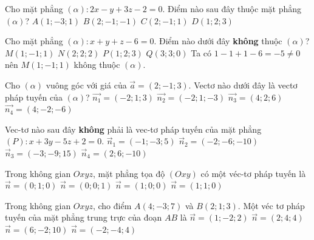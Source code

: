\begin{ex}
	Cho mặt phẳng $(\alpha) \colon 2x-y+3z-2=0$. Điểm nào sau đây thuộc mặt phẳng $(\alpha)$?
	\choice
	{$A(1;-3;1)$}
	{\True $B(2;-1;-1)$}
	{$C(2;-1;1)$}
	{$D(1;2;3)$}
\end{ex}
\begin{ex}%
	Cho mặt phẳng $(\alpha) \colon x+y+z-6=0$. Điểm nào dưới đây \textbf{không} thuộc $(\alpha)$?
	\choice
	{\True $M(1;-1;1)$}
	{$N(2;2;2)$}
	{$P(1;2;3)$}
	{$Q(3;3;0)$}
	\loigiai
	{
		Ta có $1-1+1-6=-5 \neq 0$ nên $M(1;-1;1)$ không thuộc $(\alpha)$.
	}
\end{ex}
\begin{ex}
	Cho $(\alpha)$ vuông góc với giá của $\vec{a}=(2;-1;3)$. Vectơ nào dưới đây là vectơ pháp tuyến của $(\alpha)$?
	\choice
	{$\vec{n_1}=(-2;1;3)$}
	{\True $\vec{n_2}=(-2;1;-3)$}
	{$\vec{n_3}=(4;2;6)$}
	{$\vec{n_4}=(4;-2;-6)$}
\end{ex}
\begin{ex}%
	Vec-tơ nào sau đây \textbf{không} phải là vec-tơ pháp tuyến của mặt phẳng $(P):x+3y-5z+2=0$.
	\choice
	{$\overrightarrow{n}_1=(-1;-3;5)$}
	{\True $\overrightarrow{n}_2=(-2;-6;-10)$}
	{$\overrightarrow{n}_3=(-3;-9;15)$}
	{$\overrightarrow{n}_4=(2;6;-10)$}
\end{ex}
\begin{ex}
	Trong không gian  $Oxyz$, mặt phẳng tọa độ $(Oxy)$ có một véc-tơ pháp tuyến là
	\choice
	{$\overrightarrow{n}=(0;1;0)$}
	{\True $\overrightarrow{n}=(0;0;1)$}
	{$\overrightarrow{n}=(1;0;0)$}
	{$\overrightarrow{n}=(1;1;0)$}
\end{ex}
\begin{ex}
	Trong không gian $Oxyz$, cho điểm $A(4;-3;7)$ và $B(2;1;3)$. Một véc tơ pháp tuyến của mặt phẳng trung trực của đoạn $AB$ là
	\choice
	{\True $\vec{n}=(1;-2;2)$}
	{$\vec{n}=(2;4;4)$}
	{$\vec{n}=(6;-2;10)$}
	{$\vec{n}=(-2;-4;4)$}
\end{ex}
